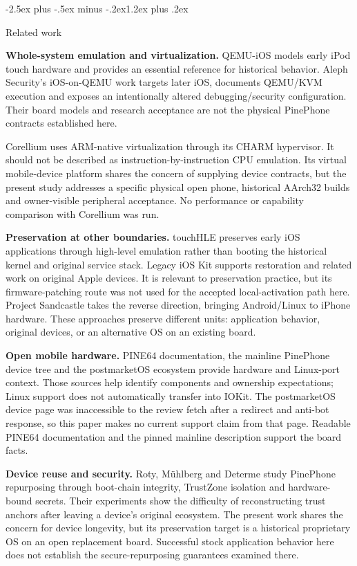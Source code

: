 \documentclass[10pt,letterpaper,twocolumn]{article}
\makeatletter
\renewcommand{\section}{\@startsection{section}{1}{0pt}
  {-2.5ex plus -.5ex minus -.2ex}{1.2ex plus .2ex}
  {\normalfont\large\bfseries\raggedright}}
\makeatother
\begin{document}
\section{Related work}

\textbf{Whole-system emulation and virtualization.} QEMU-iOS models early iPod touch hardware and provides an essential reference for historical behavior. Aleph Security's iOS-on-QEMU work targets later iOS, documents QEMU/KVM execution and exposes an intentionally altered debugging/security configuration. Their board models and research acceptance are not the physical PinePhone contracts established here. \cite{ref-5} \cite{ref-6}

Corellium uses ARM-native virtualization through its CHARM hypervisor. It should not be described as instruction-by-instruction CPU emulation. Its virtual mobile-device platform shares the concern of supplying device contracts, but the present study addresses a specific physical open phone, historical AArch32 builds and owner-visible peripheral acceptance. No performance or capability comparison with Corellium was run. \cite{ref-7}

\textbf{Preservation at other boundaries.} touchHLE preserves early iOS applications through high-level emulation rather than booting the historical kernel and original service stack. Legacy iOS Kit supports restoration and related work on original Apple devices. It is relevant to preservation practice, but its firmware-patching route was not used for the accepted local-activation path here. Project Sandcastle takes the reverse direction, bringing Android/Linux to iPhone hardware. These approaches preserve different units: application behavior, original devices, or an alternative OS on an existing board. \cite{ref-8} \cite{ref-9} \cite{ref-10}

\textbf{Open mobile hardware.} PINE64 documentation, the mainline PinePhone device tree and the postmarketOS ecosystem provide hardware and Linux-port context. Those sources help identify components and ownership expectations; Linux support does not automatically transfer into IOKit. The postmarketOS device page was inaccessible to the review fetch after a redirect and anti-bot response, so this paper makes no current support claim from that page. Readable PINE64 documentation and the pinned mainline description support the board facts. \cite{ref-1} \cite{ref-2} \cite{ref-11}

\textbf{Device reuse and security.} Roty, Mühlberg and Determe study PinePhone repurposing through boot-chain integrity, TrustZone isolation and hardware-bound secrets. Their experiments show the difficulty of reconstructing trust anchors after leaving a device's original ecosystem. The present work shares the concern for device longevity, but its preservation target is a historical proprietary OS on an open replacement board. Successful stock application behavior here does not establish the secure-repurposing guarantees examined there. \cite{ref-16}
\end{document}
